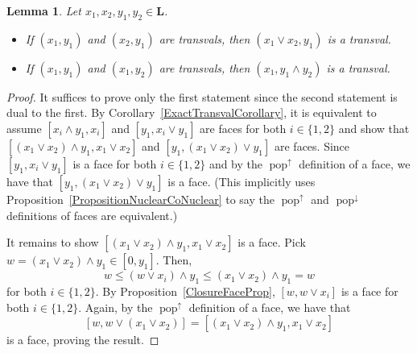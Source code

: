 \documentclass[leqno, 12pt]{amsart}
\numberwithin{equation}{section}
\renewcommand{\L}{\mathbf L}
\newcommand{\popdown}{\operatorname{pop}^\downarrow}
\newcommand{\popup}{\operatorname{pop}^\uparrow}
\numberwithin{equation}{section}
\newtheorem{lem}[thm]{Lemma}
\theoremstyle{remark}
\begin{document}
  \begin{lem}\label{TransvalsClosureLemma}
    Let \(x_1,x_2,y_1,y_2 \in \L\).
    \begin{itemize}
      \item If \((x_1,y_1)\) and \((x_2,y_1)\) are transvals, then \((x_1 \vee x_2, y_1)\) is a transval.
      \item If \((x_1,y_1)\) and \((x_1,y_2)\) are transvals, then \((x_1, y_1 \wedge y_2)\) is a transval.
    \end{itemize}
  \end{lem}
  \begin{proof}
    It suffices to prove only the first statement since the second statement is dual to the first.
    By Corollary~\ref{ExactTransvalCorollary}, it is equivalent to assume \([x_i \wedge y_1, x_i]\) and \([y_1, x_i \vee y_1]\) are faces for both \(i \in \{1,2\}\) and
    show that \([(x_1 \vee x_2) \wedge y_1, x_1 \vee x_2]\) and \([y_1, (x_1 \vee x_2) \vee y_1]\) are faces.
    Since \([y_1, x_i \vee y_1]\) is a face for both \(i \in \{1,2\}\) and by the \(\popup\) definition of a face, we have that \([y_1, (x_1 \vee x_2) \vee y_1]\) is a face.
    (This implicitly uses Proposition~\ref{PropositionNuclearCoNuclear} to say the \(\popup\) and \(\popdown\) definitions of faces are equivalent.)

    It remains to show \([(x_1 \vee x_2) \wedge y_1, x_1 \vee x_2]\) is a face.
    Pick \(w = (x_1 \vee x_2) \wedge y_1 \in [0,y_1]\). Then,
    \[w \leq (w \vee x_i) \wedge y_1 \leq (x_1 \vee x_2) \wedge y_1 = w\]
    for both \(i \in \{1,2\}\). By Proposition~\ref{ClosureFaceProp}, \([w, w \vee x_i]\) is a face for both \(i \in \{1,2\}\).
    Again, by the \(\popup\) definition of a face, we have that
    \[[w, w \vee (x_1 \vee x_2)] = [(x_1 \vee x_2) \wedge y_1, x_1 \vee x_2]\]
    is a face, proving the result.
  \end{proof}
\end{document}
